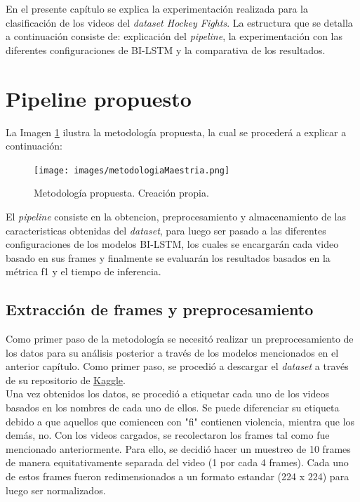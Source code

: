 En el presente capítulo se explica la experimentación 
realizada para la clasificación de los videos del 
\textit{dataset Hockey Fights}. La 
estructura que se detalla a continuación consiste de: 
explicación del \textit{pipeline}, la experimentación 
con las diferentes configuraciones de BI-LSTM y la 
comparativa de los resultados.

\section{Pipeline propuesto}

La Imagen \ref{metodologia} ilustra la metodología propuesta, 
la cual se procederá a explicar a continuación:

\begin{figure}[h!] 
    \texttt{[image: images/metodologiaMaestria.png]} 
    \centering 
    \caption{Metodología propuesta. Creación propia.} 
    \label{metodologia} 
\end{figure}

El \textit{pipeline} consiste en la obtencion, preprocesamiento 
y almacenamiento de las caracteristicas obtenidas del 
\textit{dataset}, para luego ser pasado a las diferentes 
configuraciones de los modelos BI-LSTM, los cuales se 
encargarán cada video basado en sus frames y finalmente 
se evaluarán los resultados basados en la métrica f1 y 
el tiempo de inferencia.

\subsection{Extracción de frames y preprocesamiento}

Como primer paso de la metodología se necesitó realizar un 
preprocesamiento de los datos para su análisis posterior a 
través de los modelos mencionados en el anterior capítulo. 
Como primer paso, se procedió a descargar el 
\textit{dataset} a través de su repositorio de 
\href{https://www.kaggle.com/datasets/yassershrief/hockey-fight-vidoes/data}{Kaggle}. \\

Una vez obtenidos los datos, se procedió a etiquetar cada uno 
de los videos basados en los nombres de cada uno de ellos. 
Se puede diferenciar su etiqueta debido a que aquellos que 
comiencen con "fi" contienen violencia, mientra que los demás, 
no. Con los videos cargados, se recolectaron los frames tal 
como fue mencionado anteriormente. Para ello, se decidió 
hacer un muestreo de 10 frames de manera equitativamente 
separada del video (1 por cada 4 frames). Cada uno de estos 
frames fueron redimensionados a un formato estandar (224 x 224) 
para luego ser normalizados.

